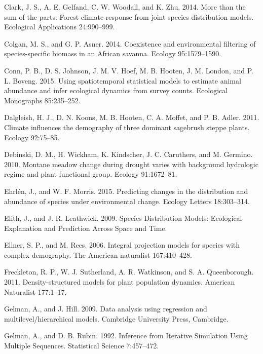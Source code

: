 \documentclass[12pt,]{article}
\begin{document}
\hypertarget{ref-Clark2014}{}
Clark, J. S., A. E. Gelfand, C. W. Woodall, and K. Zhu. 2014. More than
the sum of the parts: Forest climate response from joint species
distribution models. Ecological Applications 24:990--999.

\hypertarget{ref-Colgan2014}{}
Colgan, M. S., and G. P. Asner. 2014. Coexistence and environmental
filtering of species-specific biomass in an African savanna. Ecology
95:1579--1590.

\hypertarget{ref-Conn2015}{}
Conn, P. B., D. S. Johnson, J. M. V. Hoef, M. B. Hooten, J. M. London,
and P. L. Boveng. 2015. Using spatiotemporal statistical models to
estimate animal abundance and infer ecological dynamics from survey
counts. Ecological Monographs 85:235--252.

\hypertarget{ref-Dalgleish2011}{}
Dalgleish, H. J., D. N. Koons, M. B. Hooten, C. A. Moffet, and P. B.
Adler. 2011. Climate influences the demography of three dominant
sagebrush steppe plants. Ecology 92:75--85.

\hypertarget{ref-Debinski2010}{}
Debinski, D. M., H. Wickham, K. Kindscher, J. C. Caruthers, and M.
Germino. 2010. Montane meadow change during drought varies with
background hydrologic regime and plant functional group. Ecology
91:1672--81.

\hypertarget{ref-Ehrlen2015}{}
Ehrlén, J., and W. F. Morris. 2015. Predicting changes in the
distribution and abundance of species under environmental change.
Ecology Letters 18:303--314.

\hypertarget{ref-Elith2009}{}
Elith, J., and J. R. Leathwick. 2009. Species Distribution Models:
Ecological Explanation and Prediction Across Space and Time.

\hypertarget{ref-Ellner2006}{}
Ellner, S. P., and M. Rees. 2006. Integral projection models for species
with complex demography. The American naturalist 167:410--428.

\hypertarget{ref-Freckleton2011}{}
Freckleton, R. P., W. J. Sutherland, A. R. Watkinson, and S. A.
Queenborough. 2011. Density-structured models for plant population
dynamics. American Naturalist 177:1--17.

\hypertarget{ref-Gelman2009}{}
Gelman, A., and J. Hill. 2009. Data analysis using regression and
multilevel/hierarchical models. Cambridge University Press, Cambridge.

\hypertarget{ref-Gelman1992}{}
Gelman, A., and D. B. Rubin. 1992. Inference from Iterative Simulation
Using Multiple Sequences. Statistical Science 7:457--472.
\end{document}
